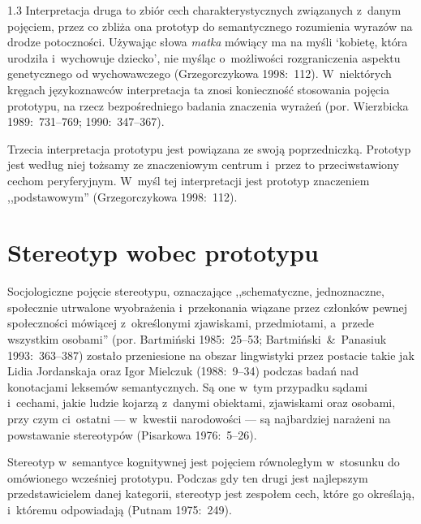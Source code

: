 \documentclass[11pt,a4paper,twoside]{report}
\begin{document}
\begin{spacing}{1.3}
Interpretacja druga to zbiór cech charakterystycznych związanych z~danym pojęciem, przez co zbliża ona prototyp do semantycznego rozumienia wyrazów na drodze potoczności. Używając słowa \emph{matka} mówiący ma na myśli ‘kobietę, która urodziła i~wychowuje dziecko’, nie myśląc o~możliwości rozgraniczenia aspektu genetycznego od wychowawczego (Grzegorczykowa 1998:~112). W~niektórych kręgach językoznawców interpretacja ta znosi konieczność stosowania pojęcia prototypu, na rzecz  bezpośredniego badania znaczenia wyrażeń (por. Wierzbicka 1989:~731--769; 1990:~347--367).

Trzecia interpretacja prototypu jest powiązana ze swoją poprzedniczką. Prototyp \linebreak jest według niej tożsamy ze znaczeniowym centrum i~przez to przeciwstawiony cechom peryferyjnym. W~myśl tej interpretacji jest prototyp znaczeniem ,,podstawowym'' (Grzegorczykowa 1998:~112).

\newpage
\chapter{Stereotyp wobec prototypu}

Socjologiczne pojęcie stereotypu, oznaczające ,,schematyczne, jednoznaczne, społecznie utrwalone wyobrażenia i~przekonania wiązane przez członków pewnej społeczności mówiącej z~określonymi zjawiskami, przedmiotami, a~przede wszystkim osobami'' (por. Bartmiński 1985:~25--53; Bartmiński~\&~Panasiuk 1993:~363--387) zostało przeniesione na obszar lingwistyki przez postacie takie jak Lidia Jordanskaja oraz Igor Mielczuk (1988:~9--34) podczas badań nad konotacjami leksemów semantycznych. Są one w~tym przypadku sądami i~cechami, jakie ludzie kojarzą z~danymi obiektami, zjawiskami oraz osobami, przy czym ci~ostatni --- w~kwestii narodowości --- są najbardziej narażeni na powstawanie stereotypów (Pisarkowa 1976:~5--26).

Stereotyp w~semantyce kognitywnej jest pojęciem równoległym w~stosunku do omówionego wcześniej prototypu. Podczas gdy ten drugi jest najlepszym przedstawicielem danej kategorii, stereotyp jest zespołem cech, które go określają, i~któremu odpowiadają (Putnam 1975:~249).


\end{spacing}
\end{document}
